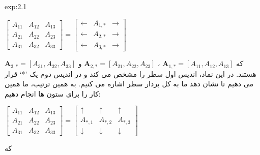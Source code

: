 {\begin{spacing}{1.5}
\begin{example}{exp:2.1}
            \begin{center}
                $\begin{bmatrix}
                     A_{11} & A_{12} & A_{13} \\
                     A_{21} & A_{22} & A_{23} \\
                     A_{31} & A_{32} & A_{33}
                \end{bmatrix}=\begin{bmatrix}
                                  \leftarrow & A_{1,*} & \rightarrow \\
                                  \leftarrow & A_{2,*} & \rightarrow \\
                                  \leftarrow & A_{3,*} & \rightarrow
                \end{bmatrix}$
            \end{center}

            که $\textbf{A}_{1,*}=[A_{11},A_{12},A_{13}]$ ، $\textbf{A}_{2,*}=[A_{21},A_{22},A_{23}]$ و $\textbf{A}_{3,*}=[A_{31},A_{32},A_{33}]$ هستند.
            در این نماد، اندیس اول سطر را مشخص می کند و در اندیس دوم یک ’*‘ قرار می دهیم تا نشان دهد ما به کل بردار سطر اشاره می کنیم. به همین ترتیب، ما همین کار را برای ستون ها انجام دهیم:

            \begin{center}
                $\begin{bmatrix}
                     A_{11} & A_{12} & A_{13} \\
                     A_{21} & A_{22} & A_{23} \\
                     A_{31} & A_{32} & A_{33}
                \end{bmatrix}=\begin{bmatrix}
                                  \uparrow   & \uparrow   & \uparrow   \\
                                  A_{*,1}    & A_{*,2}    & A_{*,3}    \\
                                  \downarrow & \downarrow & \downarrow
                \end{bmatrix}$
            \end{center}

            که


\end{example}
\end{spacing}}
